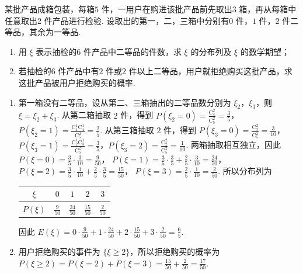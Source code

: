 \begin{problem}
某批产品成箱包装，每箱\(5\text{ 件}\)，一用户在购进该批产品前先取出\(3\text{ 箱}\)，再从每箱中任意取出\(2\text{ 件}\)产品进行检验. 设取出的第一，二，三箱中分别有\(0\text{ 件}\)，\(1\text{ 件}\)，\(2\text{ 件}\)二等品，其余为一等品.

\begin{enumerate}
\item 用 \(\xi\) 表示抽检的\(6\text{ 件}\)产品中二等品的件数，求 \(\xi\) 的分布列及 \(\xi\) 的数学期望；
\item 若抽检的\(6\text{ 件}\)产品中有\(2\text{ 件}\)或\(2\text{ 件以上}\)二等品，用户就拒绝购买这批产品，求这批产品被用户拒绝购买的概率.
\end{enumerate}
\end{problem}

\begin{solution}
\begin{enumerate}
\item 第一箱没有二等品，设从第二、三箱抽出的二等品数分别为 \(\xi_2\)，\(\xi_3\)，则 \(\xi=\xi_2+\xi_3\). 从第二箱抽取 \(2\) 件，得到 \(P(\xi_2=0)=\frac{\mathrm C_4^2}{\mathrm C_5^2}=\frac35\)，\(P(\xi_2=1)=\frac{\mathrm C_1^1\mathrm C_4^1}{\mathrm C_5^2}=\frac25\). 从第三箱抽取 \(2\) 件，得到 \(P(\xi_3=0)=\frac{\mathrm C_3^2}{\mathrm C_5^2}=\frac3{10}\)，\(P(\xi_3=1)=\frac{\mathrm C_2^1\mathrm C_3^1}{\mathrm C_5^2}=\frac35\)，\(P(\xi_3=2)=\frac{\mathrm C_2^2}{\mathrm C_5^2}=\frac1{10}\). 两箱抽取相互独立，因此
\(P(\xi=0)=\frac35\cdot\frac3{10}=\frac9{50}\)，
\(P(\xi=1)=\frac35\cdot\frac35+\frac25\cdot\frac3{10}=\frac{24}{50}\)，
\(P(\xi=2)=\frac35\cdot\frac1{10}+\frac25\cdot\frac35=\frac{15}{50}\)，
\(P(\xi=3)=\frac25\cdot\frac1{10}=\frac2{50}\). 所以分布列为
\begin{center}
\begin{tabular}{c|cccc}
\(\xi\) & \(0\) & \(1\) & \(2\) & \(3\) \\
\hline
\(P(\xi)\) & \(\frac9{50}\) & \(\frac{24}{50}\) & \(\frac{15}{50}\) & \(\frac2{50}\)
\end{tabular}
\end{center}
因此 \(E(\xi)=0\cdot\frac9{50}+1\cdot\frac{24}{50}+2\cdot\frac{15}{50}+3\cdot\frac2{50}=\frac65\).
\item 用户拒绝购买的事件为 \(\{\xi\geq2\}\)，所以拒绝购买的概率为 \(P(\xi\geq2)=P(\xi=2)+P(\xi=3)=\frac{15}{50}+\frac2{50}=\frac{17}{50}\).
\end{enumerate}
\end{solution}

